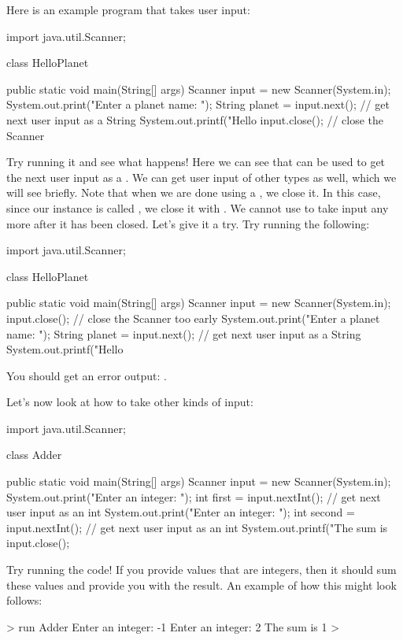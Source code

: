 Here is an example program that takes user input:
\begin{code}
import java.util.Scanner;

class HelloPlanet {

  public static void main(String[] args) {
    Scanner input = new Scanner(System.in);
    System.out.print("Enter a planet name: ");
    String planet = input.next(); // get next user input as a String
    System.out.printf("Hello %
    input.close(); // close the Scanner
  }

}
\end{code}

Try running it and see what happens!
Here we can see that  can be used to get the next
user input as a . We can get user input of other types as well,
which we will see briefly. Note that when we are done using a
, we close it. In this case, since our 
instance is called , we close it with .
We cannot use  to take input any more after it has been closed.
Let's give it a try. Try running the following:
\begin{code}
import java.util.Scanner;

class HelloPlanet {

  public static void main(String[] args) {
    Scanner input = new Scanner(System.in);
    input.close(); // close the Scanner too early
    System.out.print("Enter a planet name: ");
    String planet = input.next(); // get next user input as a String
    System.out.printf("Hello %
  }

}
\end{code}
You should get an error output: .

Let's now look at how to take other kinds of input:
\begin{code}
import java.util.Scanner;

class Adder {

  public static void main(String[] args) {
    Scanner input = new Scanner(System.in);
    System.out.print("Enter an integer: ");
    int first = input.nextInt(); // get next user input as an int
    System.out.print("Enter an integer: ");
    int second = input.nextInt(); // get next user input as an int
    System.out.printf("The sum is %
    input.close();
  }

}
\end{code}
Try running the code!
If you provide values that are integers, then it should sum these
values and provide you with the result. An example of how this might look
follows:
\begin{code}
> run Adder
Enter an integer: -1
Enter an integer: 2
The sum is 1
> 
\end{code}

